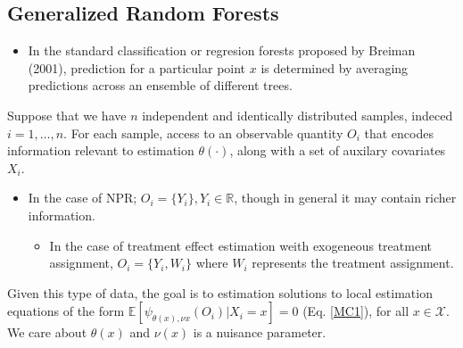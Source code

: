 \subsection{Generalized Random Forests}
\begin{itemize}
	\item In the standard classification or regresion forests proposed by Breiman (2001), prediction for a particular point $x$ is determined by averaging predictions across an ensemble of different trees.
\end{itemize}
Suppose that we have $n$ independent and identically distributed samples, indeced $i = 1, \dots, n$. For each sample, access to an observable quantity $O_i$ that encodes information relevant to estimation $\theta(\cdot)$, along with a set of auxilary covariates $X_i$.
\begin{itemize}
	\item In the case of NPR; $O_i = \{Y_i\}, Y_i \in \mathbb{R}$, though in general it may contain richer information. 
	\begin{itemize}
		\item In the case of treatment effect estimation weith exogeneous treatment assignment, $O_i = \{Y_i, W_i\}$ where $W_i$ represents the treatment assignment.
	\end{itemize}
\end{itemize}
Given this type of data, the goal is to estimation solutions to local estimation equations of the form $\mathbb{E}[\psi_{\theta(x), \nu{x}}(O_i)|X_i = x] = 0$ (Eq. \ref{MC1}), for all $x \in \mathscr{X}$. We care about $\theta(x)$ and $\nu(x)$ is a nuisance parameter. 

